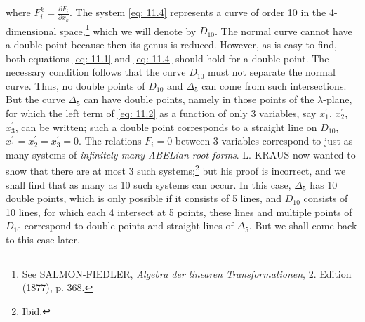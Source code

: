 \documentclass[leqno]{article}
\begin{document}
where $F_i^k = \frac{\partial F_i}{\partial x_k}$. The system \eqref{eq: 11.4} represents a curve of order 10 in the 4-dimensional space,\footnote{See SALMON-FIEDLER, \textit{Algebra der linearen Transformationen}, 2. Edition (1877), p. 368.} which we will denote by $D_{10}$. The normal curve cannot have a double point because then its genus is reduced. However, as is easy to find, both equations \eqref{eq: 11.1} and \eqref{eq: 11.4} should hold for a double point. The necessary condition follows that the curve $D_{10}$ must not separate the normal curve. Thus, no double points of $D_{10}$ and $\Delta_5$ can come from such intersections. But the curve $\Delta_5$ can have double points, namely in those points of the $\lambda$-plane, for which the left term of \eqref{eq: 11.2} as a function of only 3 variables, say $x_1^\prime$, $x_2^\prime$, $x_3^\prime$, can be written; such a double point corresponds to a straight line on $D_{10}$, $x_1^\prime=x_2^\prime=x_3^\prime=0$. The relations $F_i=0$ between 3 variables correspond to just as many systems of \textit{infinitely many ABELian root forms}. L. KRAUS now wanted to show that there are at most 3 such systems;\footnote{Ibid.} but his proof is incorrect, and we shall find that as many as 10 such systems can occur. In this case, $\Delta_5$ has 10 double points, which is only possible if it consists of 5 lines, and $D_{10}$ consists of 10 lines, for which each 4 intersect at 5 points, these lines and multiple points of $D_{10}$ correspond to double points and straight lines of $\Delta_5$. But we shall come back to this case later. \\
\end{document}
